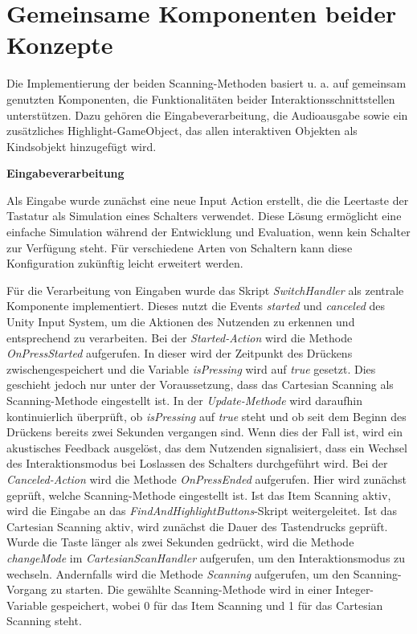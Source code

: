 \section {Gemeinsame Komponenten beider Konzepte}

Die Implementierung der beiden Scanning-Methoden basiert u. a. auf gemeinsam genutzten Komponenten, die Funktionalitäten beider Interaktionsschnittstellen unterstützen. Dazu gehören die Eingabeverarbeitung, die Audioausgabe sowie ein zusätzliches Highlight-GameObject, das allen interaktiven Objekten als Kindsobjekt hinzugefügt wird. 

{\normalfont \bfseries Eingabeverarbeitung}

Als Eingabe wurde zunächst eine neue Input Action erstellt, die die Leertaste der Tastatur als Simulation eines Schalters verwendet. Diese Lösung ermöglicht eine einfache Simulation während der Entwicklung und Evaluation, wenn kein Schalter zur Verfügung steht. Für verschiedene Arten von Schaltern kann diese Konfiguration zukünftig leicht erweitert werden.

Für die Verarbeitung von Eingaben wurde das Skript \textit{SwitchHandler} als zentrale Komponente implementiert. Dieses nutzt die Events \textit{started} und \textit{canceled} des Unity Input System, um die Aktionen des Nutzenden zu erkennen und entsprechend zu verarbeiten. Bei der \textit{Started-Action} wird die Methode \textit{OnPressStarted} aufgerufen. In dieser wird der Zeitpunkt des Drückens zwischengespeichert und die Variable \textit{isPressing} wird auf \textit{true} gesetzt. Dies geschieht jedoch nur unter der Voraussetzung, dass das Cartesian Scanning als Scanning-Methode eingestellt ist. In der \textit{Update-Methode} wird daraufhin kontinuierlich überprüft, ob \textit{isPressing} auf \textit{true} steht und ob seit dem Beginn des Drückens bereits zwei Sekunden vergangen sind. Wenn dies der Fall ist, wird ein akustisches Feedback ausgelöst, das dem Nutzenden signalisiert, dass ein Wechsel des Interaktionsmodus bei Loslassen des Schalters durchgeführt wird.
Bei der \textit{Canceled-Action} wird die Methode \textit{OnPressEnded} aufgerufen. Hier wird zunächst geprüft, welche Scanning-Methode eingestellt ist. Ist das Item Scanning aktiv, wird die Eingabe an das \textit{FindAndHighlightButtons}-Skript weitergeleitet. Ist das Cartesian Scanning aktiv, wird zunächst die Dauer des Tastendrucks geprüft. Wurde die Taste länger als zwei Sekunden gedrückt, wird die Methode \textit{changeMode} im \textit{CartesianScanHandler} aufgerufen, um den Interaktionsmodus zu wechseln. Andernfalls wird die Methode \textit{Scanning} aufgerufen, um den Scanning-Vorgang zu starten. Die gewählte Scanning-Methode wird in einer Integer-Variable gespeichert, wobei 0 für das Item Scanning und 1 für das Cartesian Scanning steht. 

